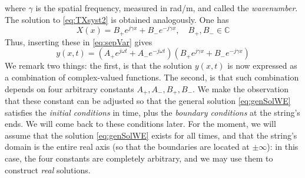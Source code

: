 where $\gamma$ is the spatial frequency, measured in rad/m, and called the \emph{wavenumber}. 
The solution to \eqref{eq:TXsyst2} is obtained analogously. One has
\begin{equation}
X(x) = B_+ e^{j\gamma x} + B_- e^{-j\gamma x}, \quad B_+,B_- \in \mathbb{C}
\end{equation}
Thus, inserting these in \eqref{eq:sepVar} gives
\begin{equation}\label{eq:genSolWE}
y(x,t) = \left( A_+ e^{j\omega t} + A_- e^{-j\omega t}\right)\left( B_+ e^{j\gamma x} + B_- e^{-j\gamma x}\right) 
\end{equation}
We remark two things: the first, is that the solution $y(x,t)$ is now expressed as a combination of complex-valued functions. The second, is that such combination depends on four arbitrary constants $A_+,A_-,B_+,B_-$. We make the observation that these constant can be adjusted so that the general solution \eqref{eq:genSolWE} satisfies the \emph{initial conditions} in time, plus the \emph{boundary conditions} at the string's ends. We will come back to these conditions later. For the moment, we will assume that the solution  \eqref{eq:genSolWE} exists for all times, and that the string's domain is the entire real axis (so that the boundaries are located at $\pm \infty$): in this case, the four constants are completely arbitrary, and we may use them to construct \emph{real} solutions. 



